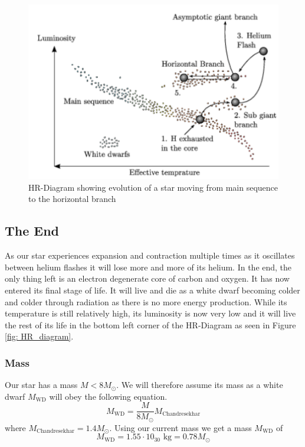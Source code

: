 \documentclass[reprint,english,notitlepage]{revtex4-2}
\begin{document}
\begin{figure}[h!]
  \centering
  \includegraphics[scale = .5]{figures/horizontal_branch}
  \caption{HR-Diagram showing evolution of a star moving from main sequence to the horizontal branch}
  \label{fig: Main to giant}
\end{figure}  

\subsection{The End}
As our star experiences expansion and contraction multiple times as it oscillates between helium flashes it will lose more and more of its helium. In the end, the only thing left is an electron degenerate core of carbon and oxygen. It has now entered its final stage of life. It will live and die as a white dwarf becoming colder and colder through radiation as there is no more energy production. While its temperature is still relatively high, its luminosity is now very low and it will live the rest of its life in the bottom left corner of the HR-Diagram as seen in Figure \ref{fig: HR_diagram}. 

\subsubsection*{Mass}
Our star has a mass $ M < 8M_{⊙} $. We will therefore assume its mass as a white dwarf $ M_{\text{WD}} $ will obey the following equation. 
\begin{equation}\label{eq: Dwarf mass }
  M_{\text{WD}} = \frac{M}{8M_{⊙}} M_{\text{Chandresekhar}}
\end{equation}   
where $ M_{\text{Chandresekhar}} = 1.4 M_{⊙} $. 
Using our current mass we get a mass $ M_{\text{WD}} $ of
\begin{equation}\label{eq: Dwarf mass calculated }
  M_{\text{WD}} = 1.55 ⋅ 10_{30} \text{ kg} = 0.78 M_{⊙}
\end{equation}
\end{document}
